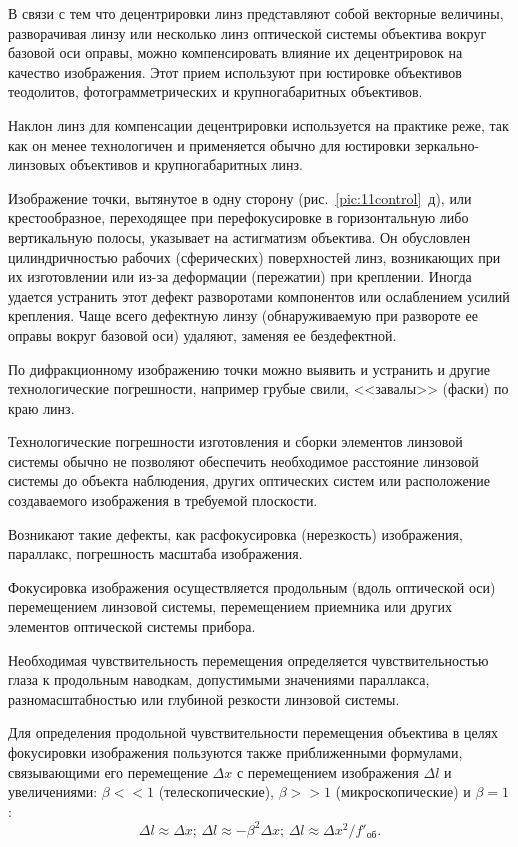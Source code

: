В связи с тем что децентрировки линз представляют собой векторные величины, разворачивая линзу или несколько линз оптической системы объектива вокруг базовой оси оправы, можно компенсировать влияние их децентрировок на качество изображения. Этот прием используют при юстировке объективов теодолитов, фотограмметрических и крупногабаритных объективов.

Наклон линз для компенсации децентрировки используется на практике реже, так как он менее технологичен и применяется обычно для юстировки зеркально-линзовых объективов и крупногабаритных линз.

Изображение точки, вытянутое в одну сторону (рис.~\ref{pic:11control}~д), или крестообразное, переходящее при перефокусировке в горизонтальную либо вертикальную полосы, указывает на астигматизм объектива. Он обусловлен цилиндричностью рабочих (сферических) поверхностей линз, возникающих при их изготовлении или из-за деформации (пережатии) при креплении. Иногда удается устранить этот дефект разворотами компонентов или ослаблением усилий крепления. Чаще всего дефектную линзу (обнаруживаемую при развороте ее оправы вокруг базовой оси) удаляют, заменяя ее бездефектной.

По дифракционному изображению точки можно выявить и устранить и другие технологические погрешности, например грубые свили, <<завалы>> (фаски) по краю линз.

Технологические погрешности изготовления и сборки элементов линзовой системы обычно не позволяют обеспечить необходимое расстояние линзовой системы до объекта наблюдения, других оптических систем или расположение создаваемого изображения в требуемой плоскости.

Возникают такие дефекты, как расфокусировка (нерезкость) изображения, параллакс, погрешность масштаба изображения.

Фокусировка изображения осуществляется продольным (вдоль оптической оси) перемещением линзовой системы, перемещением приемника или других элементов оптической системы прибора.

Необходимая чувствительность перемещения определяется чувствительностью глаза к продольным наводкам, допустимыми значениями параллакса, разномасштабностью или глубиной резкости линзовой системы.

Для определения продольной чувствительности перемещения объектива в целях фокусировки изображения пользуются также приближенными формулами, связывающими его перемещение $ \Delta x $ с перемещением изображения $ \Delta l $ и увеличениями: $ \beta << 1 $ (телескопические),  $ \beta >> 1 $ (микроскопические) и $ \beta = 1 $:
\[ \Delta l \approx \Delta x; \, \Delta l \approx - \beta^2 \Delta x; \, \Delta l \approx \Delta x^2 / f'_\text{об}. \]

